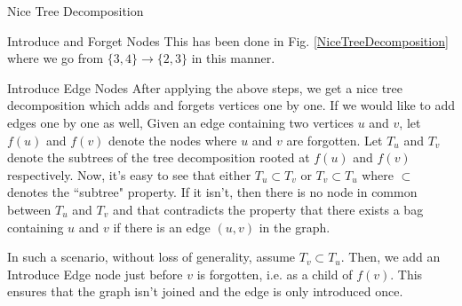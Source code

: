\begin{section}{Nice Tree Decomposition}
\begin{subsection}{Introduce and Forget Nodes}
		This has been done in Fig. \ref{NiceTreeDecomposition} where we go from $\{3, 4\} \rightarrow \{2, 3\}$ in this manner. 
	\end{subsection}

	\begin{subsection}{Introduce Edge Nodes}
		After applying the above steps, we get a nice tree decomposition which adds and forgets vertices one by one. If we would like to add edges one by one as well, 
		Given an edge containing two vertices $u$ and $v$, let $f(u)$ and $f(v)$ denote the nodes where $u$ and $v$ are forgotten. Let $T_u$ and $T_v$ denote the subtrees of the tree decomposition rooted at $f(u)$ and $f(v)$ respectively. Now, it's easy to see that either $T_u \subset T_v$ or $T_v \subset T_u$ where $\subset$ denotes the ``subtree" property. If it isn't, then there is no node in common between $T_u$ and $T_v$ and that contradicts the property that there exists a bag containing $u$ and $v$ if there is an edge $(u, v)$ in the graph. 
		
		In such a scenario, without loss of generality, assume $T_v \subset T_u$. Then, we add an Introduce Edge node just before $v$ is forgotten, i.e. as a child of $f(v)$. This ensures that the graph isn't joined and the edge is only introduced once.  
	\end{subsection}
\end{section}


